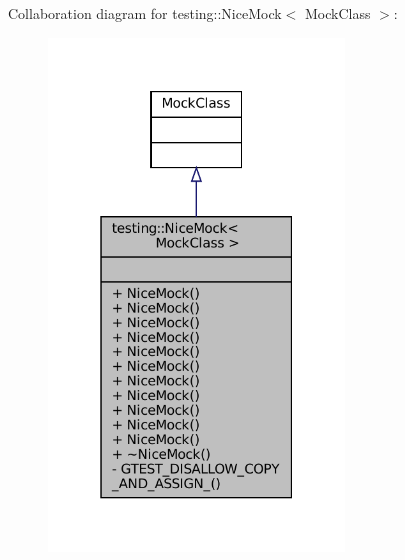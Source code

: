 Collaboration diagram for testing\+:\+:Nice\+Mock$<$ Mock\+Class $>$\+:
\nopagebreak
\begin{figure}[H]
\begin{center}
\leavevmode
\includegraphics[width=223pt]{classtesting_1_1NiceMock__coll__graph}
\end{center}
\end{figure}
